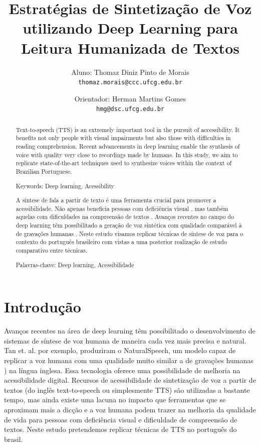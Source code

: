 \documentclass[a4paper,12pt]{article}
\title{Estratégias de Sintetização de Voz utilizando Deep Learning para Leitura Humanizada de Textos}
\author{
  Aluno: Thomaz Diniz Pinto de Morais\\
  \texttt{thomaz.morais@ccc.ufcg.edu.br}
  \and
  Orientador: Herman Martins Gomes\\
  \texttt{hmg@dsc.ufcg.edu.br}
}
\date{}
\begin{document}
	
	\maketitle
	\begin{abstract}
		Text-to-speech (TTS) is an extremely important tool in the pursuit of accessibility. It benefits not only people with visual impairments but also those with difficulties in reading comprehension. Recent advancements in deep learning enable the synthesis of voice with quality very close to recordings made by humans. In this study, we aim to replicate state-of-the-art techniques used to synthesize voices within the context of Brazilian Portuguese.
		
		Keywords: Deep learning, Acessibility
	\end{abstract}


	\begin{abstract}
		A síntese de fala a partir de texto é uma ferramenta crucial para promover a acessibilidade. Não apenas beneficia pessoas com deficiência visual \cite{WAI_2024_guidlines_for_accessibility}, mas também aquelas com dificuldades na compreensão de textos \cite{wood2017readingaccessibility}. Avanços recentes no campo do deep learning têm possibilitado a geração de voz sintética com qualidade comparável à de gravações humanas \cite{tan2022naturalspeech}. Neste estudo visamos replicar técnicas de  síntese de voz para o contexto do português brasileiro com vistas a uma posterior realização de estudo comparativo entre técnicas.
		
		Palavras-chave: Deep learning, Acessibilidade
	\end{abstract}


	
	\section{Introdução}
	
		Avanços recentes na área de deep learning têm possibilitado o desenvolvimento de sistemas de síntese de voz humana de maneira cada vez mais precisa e natural. Tan et. al. por exemplo, produziram o NaturalSpeech, um modelo capaz de replicar a voz humana com uma qualidade muito similar a de gravações humanas \cite{tan2022naturalspeech}) na língua inglesa. Essa tecnologia oferece uma possibilidade de melhoria na acessibilidade digital. Recursos de acessibilidade de sintetização de voz a partir de textos (do inglês text-to-speech ou simplesmente TTS) são utilizadas a bastante tempo, mas ainda existe uma lacuna no impacto que ferramentas que se aproximam mais a dicção e a voz humana podem trazer na melhoria da qualidade de vida para pessoas com deficiência visual e dificuldade de compreensão de textos. Neste estudo pretendemos replicar técnicas de TTS  no português do brasil.
\end{document}
